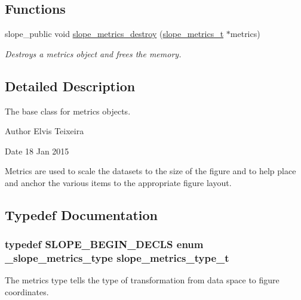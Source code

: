 \subsection*{Functions}
\begin{DoxyCompactItemize}
\item 
slope\+\_\+public void \hyperlink{group__Metrics_ga6c36874eecc6dbd3ac465da700c27d9f}{slope\+\_\+metrics\+\_\+destroy} (\hyperlink{group__Metrics_gab80787ee8ae8dc449e770249fe0e3c35}{slope\+\_\+metrics\+\_\+t} $\ast$metrics)
\begin{DoxyCompactList}\small\item\em Destroys a metrics object and frees the memory. \end{DoxyCompactList}\end{DoxyCompactItemize}


\subsection{Detailed Description}
The base class for metrics objects. 

\begin{DoxyAuthor}{Author}
Elvis Teixeira 
\end{DoxyAuthor}
\begin{DoxyDate}{Date}
18 Jan 2015
\end{DoxyDate}
Metrics are used to scale the datasets to the size of the figure and to help place and anchor the various items to the appropriate figure layout. 

\subsection{Typedef Documentation}
\hypertarget{group__Metrics_ga5f51fc24807a4b3d2b0d41f354bbcedf}{
\subsubsection[{slope\+\_\+metrics\+\_\+type\+\_\+t}]{\setlength{\rightskip}{0pt plus 5cm}typedef S\+L\+O\+P\+E\+\_\+\+B\+E\+G\+I\+N\+\_\+\+D\+E\+C\+L\+S enum {\bf \+\_\+slope\+\_\+metrics\+\_\+type}
 {\bf slope\+\_\+metrics\+\_\+type\+\_\+t}}}\label{group__Metrics_ga5f51fc24807a4b3d2b0d41f354bbcedf}


The metrics type tells the type of transformation from data space to figure coordinates. 

